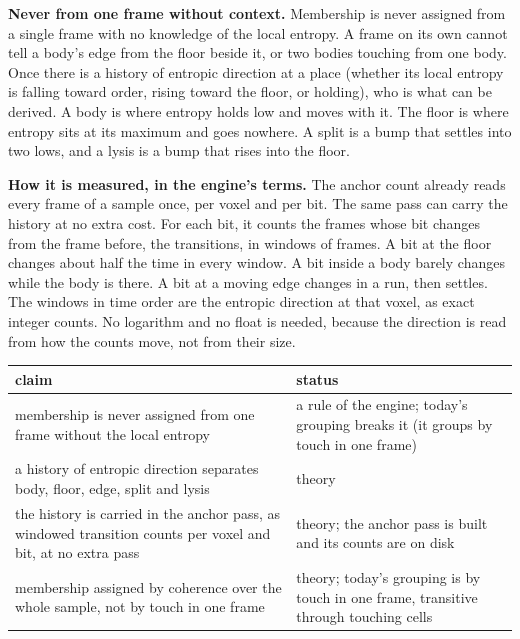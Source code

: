 \textbf{Never from one frame without context.} Membership is never assigned from a single frame with no knowledge of the local entropy. A frame on its own cannot tell a body's edge from the floor beside it, or two bodies touching from one body. Once there is a history of entropic direction at a place (whether its local entropy is falling toward order, rising toward the floor, or holding), who is what can be derived. A body is where entropy holds low and moves with it. The floor is where entropy sits at its maximum and goes nowhere. A split is a bump that settles into two lows, and a lysis is a bump that rises into the floor.

\textbf{How it is measured, in the engine's terms.} The anchor count already reads every frame of a sample once, per voxel and per bit. The same pass can carry the history at no extra cost. For each bit, it counts the frames whose bit changes from the frame before, the transitions, in windows of frames. A bit at the floor changes about half the time in every window. A bit inside a body barely changes while the body is there. A bit at a moving edge changes in a run, then settles. The windows in time order are the entropic direction at that voxel, as exact integer counts. No logarithm and no float is needed, because the direction is read from how the counts move, not from their size.

{\small
\setlength{\tabcolsep}{6pt}
\begin{longtable}{>{\RaggedRight\arraybackslash}p{}>{\RaggedRight\arraybackslash}p{}}
\toprule
claim & status \\
\midrule
\endhead
membership is never assigned from one frame without the local entropy & a rule of the engine; today's grouping breaks it (it groups by touch in one frame) \\
a history of entropic direction separates body, floor, edge, split and lysis & theory \\
the history is carried in the anchor pass, as windowed transition counts per voxel and bit, at no extra pass & theory; the anchor pass is built and its counts are on disk \\
membership assigned by coherence over the whole sample, not by touch in one frame & theory; today's grouping is by touch in one frame, transitive through touching cells \\
\bottomrule
\end{longtable}
}
